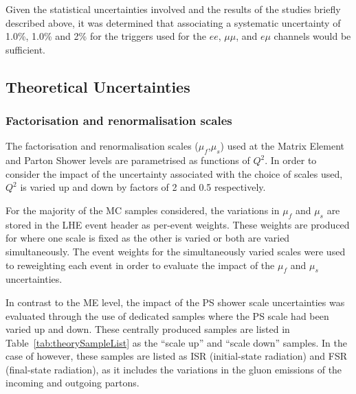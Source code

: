 %

Given the statistical uncertainties involved and the results of the studies briefly described above, it was determined that associating a systematic uncertainty of 1.0\%, 1.0\% and 2\% for the triggers used for the $ee$, $\mu\mu$, and $e \mu$ channels would be sufficient.

\subsection{Theoretical Uncertainties}\label{sec:theorySysts}

\subsubsection{Factorisation and renormalisation scales}
The factorisation and renormalisation scales ($\mu_{f}$,$\mu_{s}$) used at the Matrix Element and Parton Shower levels are parametrised as functions of $Q^{2}$.
In order to consider the impact of the uncertainty associated with the choice of scales used, $Q^{2}$ is varied up and down by factors of 2 and 0.5 respectively.

For the majority of the MC samples considered, the variations in $\mu_{f}$ and $\mu_{s}$ are stored in the LHE event header as per-event weights.
These weights are produced for where one scale is fixed as the other is varied or both are varied simultaneously.
The event weights for the simultaneously varied scales were used to reweighting each event in order to evaluate the impact of the $\mu_{f}$ and $\mu_{s}$ uncertainties.

In contrast to the ME level, the impact of the PS shower scale uncertainties was evaluated through the use of dedicated samples where the PS scale had been varied up and down.
These centrally produced samples are listed in Table~\ref{tab:theorySampleList} as the ``scale up'' and ``scale down'' samples.
In the case of \ttbar however, these samples are listed as ISR (initial-state radiation) and FSR (final-state radiation), as it includes the variations in the gluon emissions of the incoming and outgoing partons.

